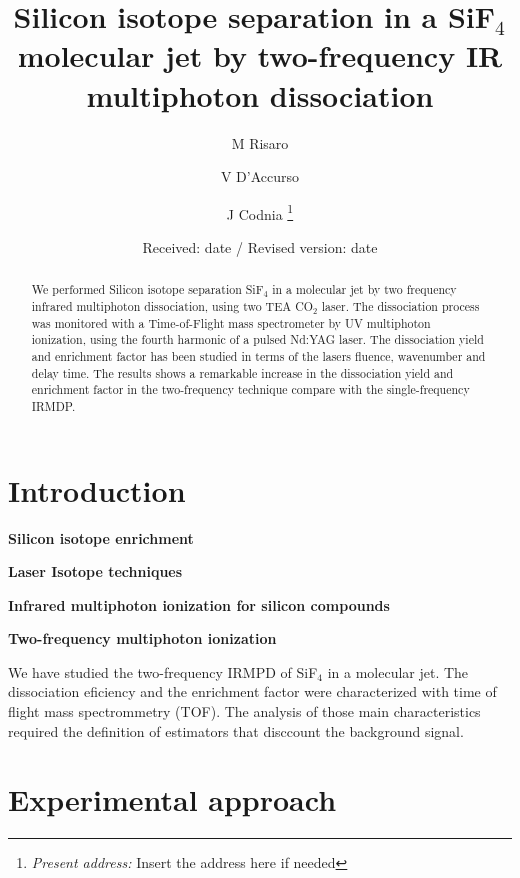 \documentclass[global,twocolumn]{svjour}
\begin{document}
\title{Silicon isotope separation in a SiF$_{4}$ molecular jet by two-frequency IR multiphoton dissociation}
	\author{M Risaro \and V D'Accurso \and J Codnia%
		\thanks{\emph{Present address:} Insert the address here if needed}%
	}                     %
	\offprints{}          %
	\date{Received: date / Revised version: date}
	\maketitle
\begin{abstract}
We performed Silicon isotope separation SiF$_{4}$ in a molecular jet by two frequency infrared multiphoton dissociation, using two TEA CO$_{2}$ laser. The dissociation process was monitored with a Time-of-Flight mass spectrometer by UV multiphoton ionization, using the fourth harmonic of a pulsed Nd:YAG laser. The dissociation yield and enrichment factor has been studied in terms of the lasers fluence, wavenumber and delay time. The results shows a remarkable increase in the dissociation yield and enrichment factor in the two-frequency technique compare with the single-frequency IRMDP.
\end{abstract}
\section{Introduction}
\label{intro}

\textbf{Silicon isotope enrichment}

\textbf{Laser Isotope techniques}

\textbf{Infrared multiphoton ionization for silicon compounds}

\textbf{Two-frequency multiphoton ionization}

We have studied the two-frequency IRMPD of SiF$_{4}$ in a molecular jet. The dissociation eficiency and the enrichment factor were characterized with time of flight mass spectrommetry (TOF). The analysis of those main characteristics required the definition of estimators that disccount the background signal.

\section{Experimental approach}
\label{sec:exerimental_approach}
\end{document}
